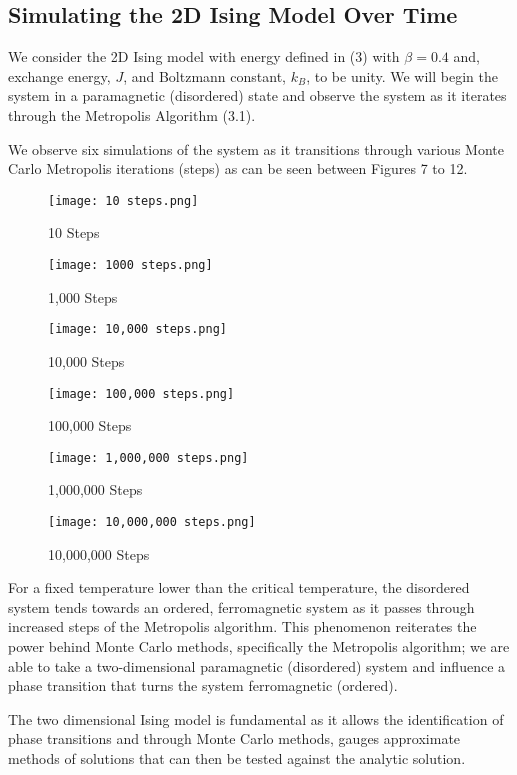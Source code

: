\documentclass[a4paper]{article}
\begin{document}
\subsection{Simulating the 2D Ising Model Over Time}

We consider the 2D Ising model with energy defined in (3) with $\beta = 0.4$ and, exchange energy, $J$, and Boltzmann constant, $k_{B}$, to be unity. We will begin the system in a paramagnetic (disordered) state and observe the system as it iterates through the Metropolis Algorithm (3.1).

We observe six simulations of the system as it transitions through various Monte Carlo Metropolis iterations (steps) as can be seen between Figures 7 to 12.

\begin{figure}[!htb]
  \texttt{[image: 10 steps.png]}
  \caption{10 Steps}\label{fig:10steps}
\endminipage\hfill
{}
  \texttt{[image: 1000 steps.png]}
  \caption{1,000 Steps}\label{fig:100steps}
\endminipage\hfill
{}%
  \texttt{[image: 10,000 steps.png]}
  \caption{10,000 Steps}\label{fig:1000steps}
\endminipage
\end{figure}

\begin{figure}[!htb]
  \texttt{[image: 100,000 steps.png]}
  \caption{100,000 Steps}\label{fig:10steps}
\endminipage\hfill
{}
  \texttt{[image: 1,000,000 steps.png]}
  \caption{1,000,000 Steps}\label{fig:100steps}
\endminipage\hfill
{}%
  \texttt{[image: 10,000,000 steps.png]}
  \caption{10,000,000 Steps}\label{fig:1000steps}
\endminipage
\end{figure}

For a fixed temperature lower than the critical temperature, the disordered system tends towards an ordered, ferromagnetic system as it passes through increased steps of the Metropolis algorithm. This phenomenon reiterates the power behind Monte Carlo methods, specifically the Metropolis algorithm; we are able to take a two-dimensional paramagnetic (disordered) system and influence a phase transition that turns the system ferromagnetic (ordered). 

The two dimensional Ising model is fundamental as it allows the identification of phase transitions and through Monte Carlo methods, gauges approximate methods of solutions that can then be tested against the analytic solution.
\end{document}
